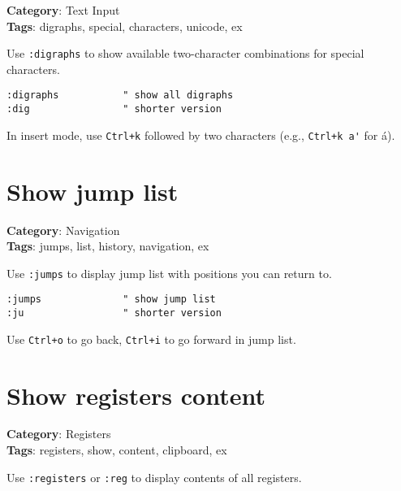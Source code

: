 {{{{{\textbf{Category}: Text Input\\ \textbf{Tags}: digraphs, special, characters, unicode, ex
\vspace{0.5cm}

Use {\footnotesize \Verb§:digraphs§} to show available two-character combinations for special characters.

\begin{Exa*}{}
\begin{Verbatim}[fontsize=\footnotesize, breaklines, breakanywhere]
:digraphs           " show all digraphs
:dig                " shorter version
\end{Verbatim}
\end{Exa*}

In insert mode, use {\footnotesize \Verb§Ctrl+k§} followed by two characters (e.g., {\footnotesize \Verb§Ctrl+k a'§} for á).

\section{Show jump list}

\textbf{Category}: Navigation\\ \textbf{Tags}: jumps, list, history, navigation, ex
\vspace{0.5cm}

Use {\footnotesize \Verb§:jumps§} to display jump list with positions you can return to.

\begin{Exa*}{}
\begin{Verbatim}[fontsize=\footnotesize, breaklines, breakanywhere]
:jumps              " show jump list
:ju                 " shorter version
\end{Verbatim}
\end{Exa*}

Use {\footnotesize \Verb§Ctrl+o§} to go back, {\footnotesize \Verb§Ctrl+i§} to go forward in jump list.

\section{Show registers content}

\textbf{Category}: Registers\\ \textbf{Tags}: registers, show, content, clipboard, ex
\vspace{0.5cm}

Use {\footnotesize \Verb§:registers§} or {\footnotesize \Verb§:reg§} to display contents of all registers.

}}}}}
